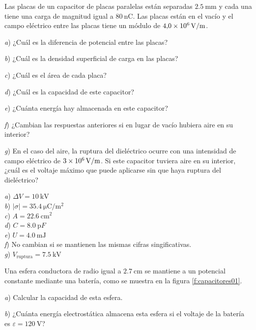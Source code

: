 \setcounter{figure}{0}
%
\begin{Exercise}
  Las placas de un capacitor de placas paralelas están separadas $\SI{2.5}{\milli\metre}$ y cada una tiene una carga de magnitud igual a $\SI{80}{\nano\coulomb}$. Las placas están en el vacío y el campo eléctrico entre las placas tiene un módulo de $\SI{4.0E6}{\volt/\metre}$.\par
  \textit{a}) ¿Cuál es la diferencia de potencial entre las placas?\par
  \textit{b}) ¿Cuál es la densidad superficial de carga en las placas?\par
  \textit{c}) ¿Cuál es el área de cada placa?\par
  \textit{d}) ¿Cuál es la capacidad de este capacitor?\par
  \textit{e}) ¿Cuánta energía hay almacenada en este capacitor?\par
  \textit{f}) ¿Cambian las respuestas anteriores si en lugar de vacío hubiera aire en su interior?\par
  \textit{g}) En el caso del aire, la ruptura del dieléctrico ocurre con una intensidad de campo eléctrico de $\SI{3E6}{\volt/\metre}$. Si este capacitor tuviera aire en su interior, ¿cuál es el voltaje máximo que puede aplicarse sin que haya ruptura del dieléctrico?
\end{Exercise}
\begin{Answer}
    \begin{minipage}[t]{.4\textwidth}
      \textit{a}) $\Delta V = \SI{10}{\kilo\volt}$\\ \textit{b}) $|\sigma| = \SI{35.4}{\micro\coulomb/\metre\squared}$\\ \textit{c}) $A = \SI{22.6}{\centi\metre^2}$\\ \textit{d}) $C = \SI{8.0}{\pico F}$\\ \textit{e}) $U = \SI{4.0}{\milli\joule}$\\ \textit{f}) No cambian si se mantienen las mismas cifras singificativas.\\ \textit{g}) $V_\text{ruptura} = \SI{7.5}{\kilo\volt}$
    \end{minipage}
\end{Answer}
%
\begin{Exercise}\label{p:capacitores01}
  Una esfera conductora de radio igual a $\SI{2.7}{\centi\metre}$ se mantiene a un potencial constante mediante una batería, como se muestra en la figura \ref{f:capacitores01}.\par
  \textit{a}) Calcular la capacidad de esta esfera.\par
  \textit{b}) ¿Cuánta energía electrostática almacena esta esfera si el voltaje de la batería es $\varepsilon = \SI{120}{\volt}$?
\end{Exercise}
